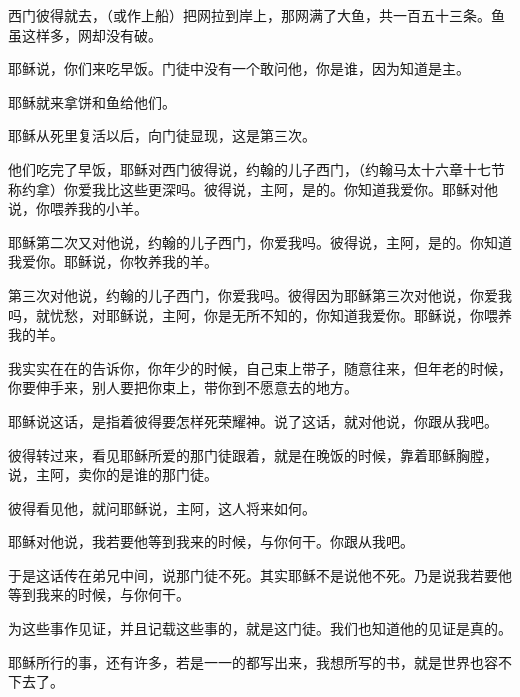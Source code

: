 \documentclass[12pt,oneside]{book}
\begin{document}
西门彼得就去，（或作上船）把网拉到岸上，那网满了大鱼，共一百五十三条。鱼虽这样多，网却没有破。

耶稣说，你们来吃早饭。门徒中没有一个敢问他，你是谁，因为知道是主。

耶稣就来拿饼和鱼给他们。

耶稣从死里复活以后，向门徒显现，这是第三次。

他们吃完了早饭，耶稣对西门彼得说，约翰的儿子西门，（约翰马太十六章十七节称约拿）你爱我比这些更深吗。彼得说，主阿，是的。你知道我爱你。耶稣对他说，你喂养我的小羊。

耶稣第二次又对他说，约翰的儿子西门，你爱我吗。彼得说，主阿，是的。你知道我爱你。耶稣说，你牧养我的羊。

第三次对他说，约翰的儿子西门，你爱我吗。彼得因为耶稣第三次对他说，你爱我吗，就忧愁，对耶稣说，主阿，你是无所不知的，你知道我爱你。耶稣说，你喂养我的羊。

我实实在在的告诉你，你年少的时候，自己束上带子，随意往来，但年老的时候，你要伸手来，别人要把你束上，带你到不愿意去的地方。

耶稣说这话，是指着彼得要怎样死荣耀神。说了这话，就对他说，你跟从我吧。

彼得转过来，看见耶稣所爱的那门徒跟着，就是在晚饭的时候，靠着耶稣胸膛，说，主阿，卖你的是谁的那门徒。

彼得看见他，就问耶稣说，主阿，这人将来如何。

耶稣对他说，我若要他等到我来的时候，与你何干。你跟从我吧。

于是这话传在弟兄中间，说那门徒不死。其实耶稣不是说他不死。乃是说我若要他等到我来的时候，与你何干。

为这些事作见证，并且记载这些事的，就是这门徒。我们也知道他的见证是真的。

耶稣所行的事，还有许多，若是一一的都写出来，我想所写的书，就是世界也容不下去了。


\backmatter
\end{document}
